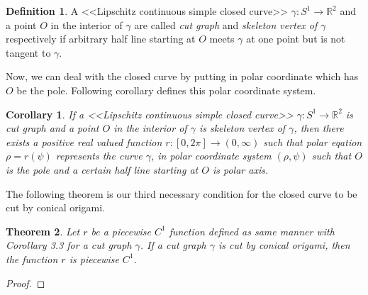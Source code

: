 \documentclass{amsart}
\theoremstyle{plain}
\newtheorem{theorem}{Theorem}[section]
\newtheorem{corollary}[theorem]{Corollary}
\theoremstyle{definition}
\newtheorem*{definition}{Definition}
\theoremstyle{remark}
\begin{document}
\begin{definition}%
A <<Lipschitz continuous simple closed curve>> $\gamma:S^1\to{\mathbb R}^2$ and a point $O$ in the interior of $\gamma$ are called {\it cut graph} and {\it skeleton vertex of $\gamma$} respectively if arbitrary half line starting at $O$ meets $\gamma$ at one point but is not tangent to $\gamma$.
\end{definition}


Now, we can deal with the closed curve by putting in polar coordinate which has $O$ be the pole.
Following corollary defines this polar coordinate system.


\begin{corollary}\label{3.3}%
If a <<Lipschitz continuous simple closed curve>> $\gamma:S^1\to{\mathbb R}^2$ is cut graph and a point $O$ in the interior of $\gamma$ is skeleton vertex of $\gamma$, then there exists a positive real valued function $r:[0,2\pi]\to(0,\infty)$ such that polar eqation $\rho=r(\psi)$ represents the curve $\gamma$, in polar coordinate system $(\rho,\psi)$ such that $O$ is the pole and a certain half line starting at $O$ is polar axis.
\end{corollary}

The following theorem is our third necessary condition for the closed curve to be cut by conical origami.

\begin{theorem}\label{3.4}%
Let $r$ be a piecewise $C^1$ function defined as same manner with Corollary 3.3 for a cut graph $\gamma$. If a cut graph $\gamma$ is cut by conical origami, then the function $r$ is piecewise $C^1$.
\end{theorem}

\begin{proof}

\end{proof}










\section{}%

\end{document}
